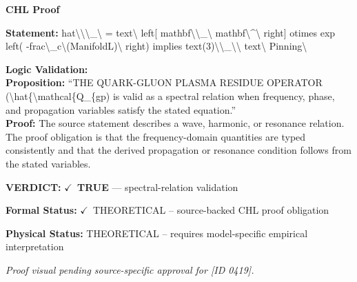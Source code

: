 \vspace{0.45em}
\noindent\textbf{CHL Proof}\par
\textbf{Statement:} hat\textbackslash{}\textbackslash{}\textbackslash{}\_\textbackslash{} = text\textbackslash{} left[ mathbf\textbackslash{}\textbackslash{}\_\textbackslash{} mathbf\textbackslash{}\textasciicircum{}\textbackslash{} right] otimes exp left(
-frac\textbackslash{}\_c\textbackslash{}(ManifoldL)\textbackslash{} right) implies text(3)\textbackslash{}\textbackslash{}\_\textbackslash{}\textbackslash{} text\textbackslash{} Pinning\textbackslash{}

\textbf{Logic Validation:}\\
\textbf{Proposition:} ``THE QUARK-GLUON PLASMA RESIDUE OPERATOR (\textbackslash{}hat\{\textbackslash{}mathcal\{Q\_\{gp) is valid as a spectral
relation when frequency, phase, and propagation variables satisfy the stated equation.''\\
\textbf{Proof:} The source statement describes a wave, harmonic, or resonance relation. The proof
obligation is that the frequency-domain quantities are typed consistently and that the
derived propagation or resonance condition follows from the stated variables.

\textbf{VERDICT:} \ensuremath{\checkmark}\ \textbf{TRUE} --- spectral-relation validation

\textbf{Formal Status:} \ensuremath{\checkmark}\ THEORETICAL -- source-backed CHL proof obligation

\textbf{Physical Status:} THEORETICAL -- requires model-specific empirical interpretation
\par\vspace{0.45em}
\par
\vfill
\begingroup\footnotesize\itshape
Proof visual pending source-specific approval for [ID 0419].
\par\endgroup
\vfill
\endgroup
\endgroup
